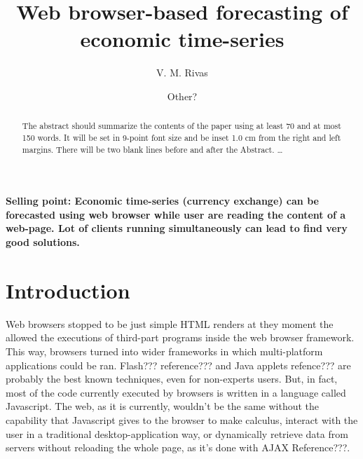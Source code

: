 \documentclass{llncs}
\begin{document}
%
%
\mainmatter              %
%
\title{Web browser-based forecasting of economic time-series}
%
%
\author{
V. M. Rivas 
\and Other?
}
%
%
%

\maketitle              %
\textbf{Selling point: Economic time-series (currency exchange) can be forecasted using web browser while user are reading the content of a web-page. Lot of clients running simultaneously can lead to find very good solutions.}
\begin{abstract}
{\color{red}
The abstract should summarize the contents of the paper
using at least 70 and at most 150 words. It will be set in 9-point
font size and be inset 1.0 cm from the right and left margins.
There will be two blank lines before and after the Abstract. \dots
}
\end{abstract}
%
\section{Introduction}
Web browsers stopped to be just simple HTML renders at they moment the allowed the executions of third-part programs inside the web browser framework. This way, browsers turned into wider frameworks in which multi-platform applications could be ran. Flash??? reference??? and Java applets refence??? are probably the best known techniques, even for non-experts users. But, in fact, most of the code currently executed by browsers is written in a language called Javascript. The web, as it is currently, wouldn't be the same without the capability that Javascript gives to the browser to make calculus, interact with the user in a traditional desktop-application way, or dynamically retrieve data from servers without reloading the whole page, as it's done with AJAX Reference???. 
\end{document}
